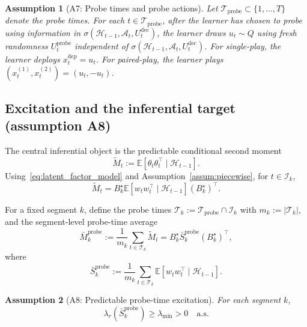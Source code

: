 \documentclass[12pt]{article}
\newcommand{\E}{\mathbb{E}}
\newcommand{\cA}{\mathcal{A}}
\newcommand{\cH}{\mathcal{H}}
\newcommand{\cT}{\mathcal{T}}
\newcommand{\cI}{\mathcal{I}}
\newcommand{\cTprobe}{\mathcal{T}_{\mathrm{probe}}}
\newtheorem{assumption}{Assumption}
\theoremstyle{plain}
\theoremstyle{definition}
\begin{document}
\begin{assumption}[A7: Probe times and probe actions]
\label{assum:probe_times}
Let $\cTprobe \subset \{1, \dots, T\}$ denote the probe times. For each $t \in \cTprobe$, after the learner has chosen to probe using information in $\sigma(\cH_{t-1}, \cA_t, U_t^{\mathrm{dec}})$, the learner draws $u_t \sim Q$ using fresh randomness $U_t^{\mathrm{probe}}$ independent of $\sigma(\cH_{t-1}, \cA_t, U_t^{\mathrm{dec}})$. For single-play, the learner deploys $x_t^{\mathrm{dep}} = u_t$. For paired-play, the learner plays $(x_t^{(1)}, x_t^{(2)}) = (u_t, -u_t)$.
\end{assumption}

\subsection{Excitation and the inferential target (assumption A8)}

The central inferential object is the predictable conditional second moment
\begin{equation}
\widetilde{M}_t := \E[\theta_t \theta_t^\top \mid \cH_{t-1}].
\label{eq:predictable_second_moment}
\end{equation}
Using~\eqref{eq:latent_factor_model} and Assumption~\ref{assum:piecewise}, for $t \in \cI_k$,
\begin{equation}
\widetilde{M}_t = B_k^\star \E[w_t w_t^\top \mid \cH_{t-1}] (B_k^\star)^\top.
\label{eq:Mtilde_factorized}
\end{equation}

For a fixed segment $k$, define the probe times $\cT_k := \cTprobe \cap \cI_k$ with $m_k := |\cT_k|$, and the segment-level probe-time average
\begin{equation}
\bar{M}_k^{\mathrm{probe}} := \frac{1}{m_k} \sum_{t \in \cT_k} \widetilde{M}_t
= B_k^\star \bar{S}_k^{\mathrm{probe}} (B_k^\star)^\top,
\label{eq:segment_target}
\end{equation}
where
\begin{equation}
\bar{S}_k^{\mathrm{probe}} := \frac{1}{m_k} \sum_{t \in \cT_k} \E[w_t w_t^\top \mid \cH_{t-1}].
\label{eq:Sbar}
\end{equation}

\begin{assumption}[A8: Predictable probe-time excitation]
\label{assum:excitation}
For each segment $k$,
\[
\lambda_r(\bar{S}_k^{\mathrm{probe}}) \ge \lambda_{\min} > 0 \quad \text{a.s.}
\]
\end{assumption}
\end{document}

